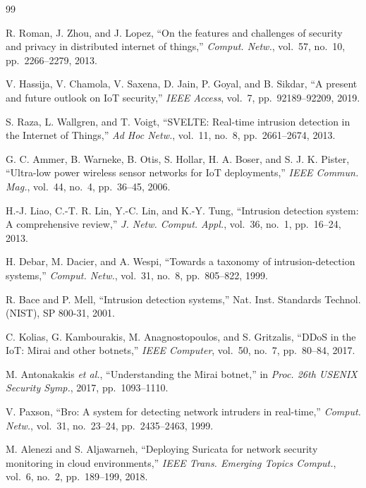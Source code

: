 \documentclass[journal]{IEEEtran}
\begin{document}
\balance
\begin{thebibliography}{99}

R. Roman, J. Zhou, and J. Lopez, ``On the features and challenges of security and privacy in distributed internet of things,'' \textit{Comput. Netw.}, vol.~57, no.~10, pp.~2266--2279, 2013.

V. Hassija, V. Chamola, V. Saxena, D. Jain, P. Goyal, and B. Sikdar, ``A present and future outlook on {IoT} security,'' \textit{IEEE Access}, vol.~7, pp.~92189--92209, 2019.

S. Raza, L. Wallgren, and T. Voigt, ``SVELTE: Real-time intrusion detection in the Internet of Things,'' \textit{Ad Hoc Netw.}, vol.~11, no.~8, pp.~2661--2674, 2013.

G. C. Ammer, B. Warneke, B. Otis, S. Hollar, H. A. Boser, and S. J. K. Pister, ``Ultra-low power wireless sensor networks for {IoT} deployments,'' \textit{IEEE Commun. Mag.}, vol.~44, no.~4, pp.~36--45, 2006.

H.-J. Liao, C.-T. R. Lin, Y.-C. Lin, and K.-Y. Tung, ``Intrusion detection system: A comprehensive review,'' \textit{J. Netw. Comput. Appl.}, vol.~36, no.~1, pp.~16--24, 2013.

H. Debar, M. Dacier, and A. Wespi, ``Towards a taxonomy of intrusion-detection systems,'' \textit{Comput. Netw.}, vol.~31, no.~8, pp.~805--822, 1999.

R. Bace and P. Mell, ``Intrusion detection systems,'' Nat. Inst. Standards Technol. (NIST), SP 800-31, 2001.

C. Kolias, G. Kambourakis, M. Anagnostopoulos, and S. Gritzalis, ``{DDoS} in the {IoT}: {M}irai and other botnets,'' \textit{IEEE Computer}, vol.~50, no.~7, pp.~80--84, 2017.

M. Antonakakis \textit{et al.}, ``Understanding the {M}irai botnet,'' in \textit{Proc. 26th USENIX Security Symp.}, 2017, pp.~1093--1110.

V. Paxson, ``Bro: A system for detecting network intruders in real-time,'' \textit{Comput. Netw.}, vol.~31, no.~23--24, pp.~2435--2463, 1999.

M. Alenezi and S. Aljawarneh, ``Deploying Suricata for network security monitoring in cloud environments,'' \textit{IEEE Trans. Emerging Topics Comput.}, vol.~6, no.~2, pp.~189--199, 2018.


\end{thebibliography}
\end{document}
